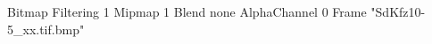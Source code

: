 {Bitmap
	{Filtering 1}
	{Mipmap 1}
	{Blend none}
	{AlphaChannel 0}
	{Frame "SdKfz10-5_xx.tif.bmp"}
}
